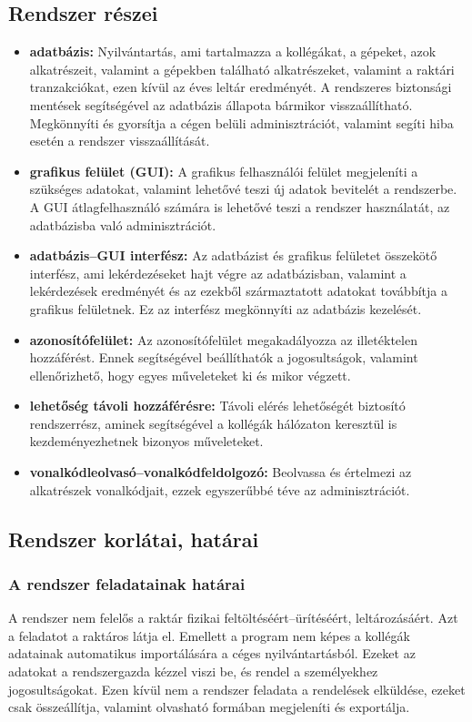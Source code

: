 \documentclass[12pt]{article}\usepackage[left=20mm,right=20mm,top=15mm,bottom=20mm]{geometry}
\begin{document}
\subsection{Rendszer részei}
\begin{itemize}
\item[] \textbf{adatbázis: } Nyilvántartás, ami tartalmazza a kollégákat, a gépeket, azok alkatrészeit, valamint a gépekben található alkatrészeket, valamint a raktári tranzakciókat, ezen kívül az éves leltár eredményét. A rendszeres biztonsági mentések segítségével az adatbázis állapota bármikor visszaállítható. Megkönnyíti és gyorsítja a cégen belüli adminisztrációt, valamint segíti hiba esetén a rendszer visszaállítását.

\item[] \textbf{grafikus felület (GUI): } A grafikus felhasználói felület megjeleníti a szükséges adatokat, valamint lehetővé teszi új adatok bevitelét a rendszerbe. 
A GUI átlagfelhasználó számára is lehetővé teszi a rendszer használatát, az adatbázisba való adminisztrációt. 

\item[] \textbf{adatbázis--GUI interfész: } Az adatbázist és grafikus felületet összekötő interfész, ami lekérdezéseket hajt végre az adatbázisban, valamint a lekérdezések eredményét és az ezekből származtatott adatokat továbbítja a grafikus felületnek.
Ez az interfész megkönnyíti az adatbázis kezelését.

\item[] \textbf{azonosítófelület: } Az azonosítófelület megakadályozza az illetéktelen hozzáférést. Ennek segítségével beállíthatók a jogosultságok, valamint ellenőrizhető, hogy egyes műveleteket ki és mikor végzett.

\item[] \textbf{lehetőség távoli hozzáférésre: } Távoli elérés lehetőségét biztosító rendszerrész, aminek segítségével a kollégák hálózaton keresztül is kezdeményezhetnek bizonyos műveleteket.

\item[] \textbf{vonalkódleolvasó--vonalkódfeldolgozó: } Beolvassa és értelmezi az alkatrészek vonalkódjait, ezzek egyszerűbbé téve az adminisztrációt.
\end{itemize}

\subsection{Rendszer korlátai, határai}
\subsubsection{A rendszer feladatainak határai}
A rendszer nem felelős a raktár fizikai feltöltéséért--ürítéséért, leltározásáért. Azt a feladatot a raktáros látja el.
Emellett a program nem képes a kollégák adatainak automatikus importálására a céges nyilvántartásból. 
Ezeket az adatokat a rendszergazda kézzel viszi be, és rendel a személyekhez jogosultságokat.
Ezen kívül nem a rendszer feladata a rendelések elküldése, ezeket csak összeállítja, valamint olvasható formában megjeleníti és exportálja.
\end{document}
